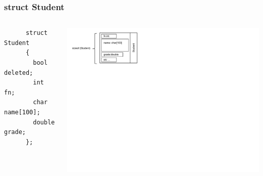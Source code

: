 \documentclass{beamer}
\begin{document}
\begin{frame}[fragile]
\frametitle{struct Student}


\begin{columns}[t]
  \begin{column}{0.5\textwidth}
      \vspace{-350px}
      \begin{flushleft}
      \begin{lstlisting}
      struct Student
      {
        bool deleted;
        int fn;
        char name[100];
        double grade;
      };
      \end{lstlisting}
      \end{flushleft} 
  \end{column}
  \begin{column}{0.5\textwidth}
  \includegraphics[width=16cm]{images/structstudent}
  \end{column}
\end{columns}


\end{frame}
\end{document}
